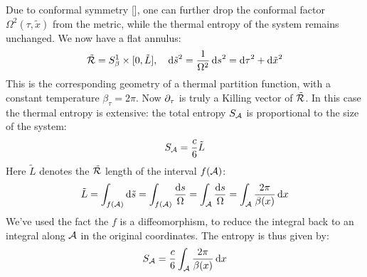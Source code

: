 \documentclass[11pt,a4paper]{article}
\begin{document}
	Due to conformal symmetry [], one can further drop the conformal factor $\Omega^2(\tau,\tilde{x})$ from the metric, while the thermal entropy of the system remains unchanged. We now have a flat annulus:
	\begin{equation}
		\tilde{\mathcal{R}}
		= S^1_\beta \times [0,\tilde{L}],
	\quad
		\dd{\tilde{s}}^2
		= \frac{1}{\Omega^2} \dd{s}^2
		= \dd{\tau}^2 + \dd{\tilde{x}}^2
	\end{equation}
	This is the corresponding geometry of a thermal partition function, with a constant temperature $\beta_\tau = 2\pi$. 
	Now $\partial_{\tau}$ is truly a Killing vector of $\tilde{\mathcal{R}}$. 
	In this case the thermal entropy is extensive: the total entropy $S_{\mathcal{A}}$ is proportional to the size of the system:
	\begin{equation}
		S_{\mathcal{A}}
		= \frac{c}{6} \tilde{L}
	\end{equation}
	Here $\tilde{L}$ denotes the $\tilde{\mathcal{R}}$ length of the interval $f(\mathcal{A})$:
	\begin{equation}
		\tilde{L}
		= \int_{f(\mathcal{A})} \dd{\tilde{s}}
		= \int_{f(\mathcal{A})} \frac{\dd{s}}{\Omega}
		= \int_{\mathcal{A}} \frac{\dd{s}}{\Omega}
		= \int_{\mathcal{A}} \frac{2\pi}{\beta(x)} \dd{x}
	\end{equation}
	We've used the fact the $f$ is a diffeomorphism, to reduce the integral back to an integral along $\mathcal{A}$ in the original coordinates. 
	The entropy is thus given by:
	\begin{equation}
		S_{\mathcal{A}}
		= \frac{c}{6}
			\int_{\mathcal{A}} \frac{2\pi}{\beta(x)} \dd{x}
	\end{equation}
	
\end{document}
